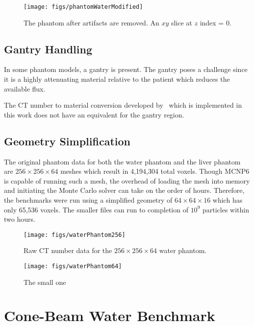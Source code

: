 \begin{figure}[tb]
  \begin{center}
   \texttt{[image: figs/phantomWaterModified]}
  \end{center}
  \caption{The phantom after artifacts are removed. An $xy$ slice at $z$ index = 0.}
\label{fig:phantomWaterModified}
\end{figure}

\subsection{Gantry Handling}
In some phantom models, a gantry is present. The gantry poses a challenge since it is a highly attenuating material relative to the patient which reduces the available flux.

The CT number to material conversion developed by~\cite{ref:ottossonr} which is implemented in this work does not have an equivalent for the gantry region.

\subsection{Geometry Simplification}
The original phantom data for both the water phantom and the liver phantom are $256\times256\times64$ meshes which result in 4,194,304 total voxels. Though MCNP6 is capable of running such a mesh, the overhead of loading the mesh into memory and initiating the Monte Carlo solver can take on the order of hours. Therefore, the benchmarks were run using a simplified geometry of $64\times64\times16$ which has only 65,536 voxels. The smaller files can run to completion of $10^9$ particles within two hours.

\begin{figure}[tb]
  \begin{center}
   \texttt{[image: figs/waterPhantom256]}
  \end{center}
  \caption{Raw CT number data for the $256 \times 256 \times 64$ water phantom.}
\label{fig:waterPhantom256}
\end{figure}

\begin{figure}[tb]
  \begin{center}
   \texttt{[image: figs/waterPhantom64]}
  \end{center}
  \caption{The small one}
\label{fig:waterPhantom64}
\end{figure}

\section{Cone-Beam Water Benchmark}

